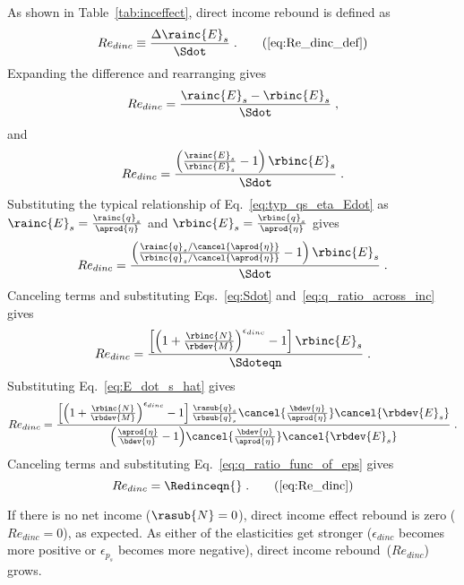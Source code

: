 As shown in Table~\ref{tab:inceffect}, direct income rebound is defined as
%
\begin{equation}
  Re_{dinc} \equiv \frac{\Delta \rainc{E}_s}{\Sdot} \; . \tag{\ref{eq:Re_dinc_def}}
\end{equation}
%
Expanding the difference and rearranging gives
%
\begin{equation}
  Re_{dinc} = \frac{\rainc{E}_s - \rbinc{E}_s}{\Sdot} \; , 
\end{equation}
%
and
%
\begin{equation}
  Re_{dinc} = \frac{\left( \frac{\rainc{E}_s}{\rbinc{E}_s} - 1  \right) \rbinc{E}_s}{\Sdot} \; .
\end{equation}
%
Substituting the typical relationship of Eq.~\ref{eq:typ_qs_eta_Edot} as
$\rainc{E}_s = \frac{\rainc{q}_s}{\aprod{\eta}}$ and  
$\rbinc{E}_s = \frac{\rbinc{q}_s}{\aprod{\eta}}$ gives
%
\begin{equation}
  Re_{dinc} = \frac{\left( \frac{\rainc{q}_s / \cancel{\aprod{\eta}}}{\rbinc{q}_s / \cancel{\aprod{\eta}}} - 1  \right) \rbinc{E}_s} 
              {\Sdot} \; .
\end{equation}
%
Canceling terms and substituting Eqs.~\ref{eq:Sdot} and~\ref{eq:q_ratio_across_inc} gives
%
\begin{equation}
  Re_{dinc} = \frac{\left[ \left( 1 + \frac{\rbinc{N}}{\rbdev{M}} \right) ^{\epsilon_{dinc}} - 1  \right] \rbinc{E}_s} 
              {\Sdoteqn} \; .
\end{equation}
%
Substituting Eq.~\ref{eq:E_dot_s_hat} gives
%
\begin{equation}
  Re_{dinc} = \frac{\left[ \left( 1 + \frac{\rbinc{N}}{\rbdev{M}} \right) ^{\epsilon_{dinc}} - 1  \right] 
                  \frac{\rasub{q}_s}{\rbsub{q}_s}
                \cancel{\frac{\bdev{\eta}}{\aprod{\eta}}}
                \cancel{\rbdev{E}_s}}
              {\left( \frac{\aprod{\eta}}{\bdev{\eta}} - 1 \right)\! \cancel{\frac{\bdev{\eta}}{\aprod{\eta}}} \cancel{\rbdev{E}_s}} \; .
\end{equation}
%
Canceling terms and substituting Eq.~\ref{eq:q_ratio_func_of_eps} gives
%
\begin{equation} 
  Re_{dinc} = \Redinceqn{} \; . \tag{\ref{eq:Re_dinc}}
\end{equation}

If there is no net income ($\rasub{N} = 0$), 
direct income effect rebound is zero ($Re_{dinc} = 0$), as expected.
As either of the elasticities get stronger 
($\epsilon_{dinc}$ becomes more positive or $\epsilon_{p_s}$ becomes more negative), 
direct income rebound~($Re_{dinc}$) grows.

